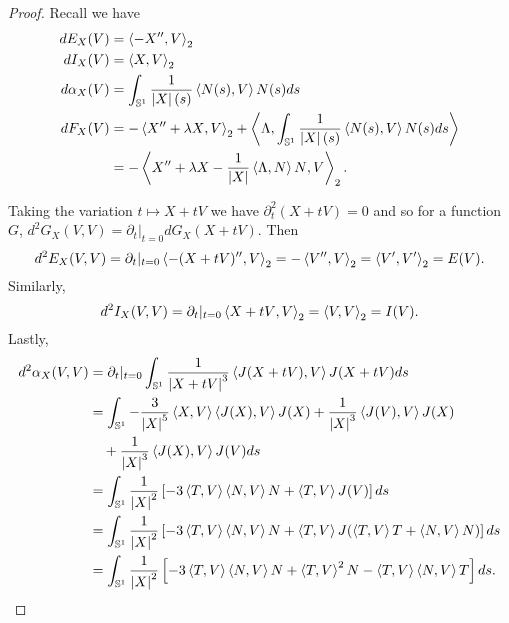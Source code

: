 \documentclass[12pt]{article}
\begin{document}
\begin{proof}
Recall we have
\begin{align*}
dE_X (V) &= \inpr{-X''}{V}_2 \\
dI_X (V) &= \inpr{X}{V}_2 \\
d\alpha_X (V) &= \int_{\So} \frac{1}{\abs{X}(s)} \inpr{N(s)}{V} N(s) ds \\
dF_X (V) &= -\inpr{X'' + \lambda X}{V}_2 + \inpr{\Lambda}{\int_{\So} \frac{1}{\abs{X}(s)} \inpr{N(s)}{V} N(s) ds} \\
&= -\inpr{X'' + \lambda X - \frac{1}{\abs{X}} \inpr{\Lambda}{N}N}{V}_2.
\end{align*}

Taking the variation \(t \mapsto X + tV\) we have \(\partial_t^2 (X + tV) = 0\) and so for a function \(G\), \(d^2G_X (V, V) = \partial_t|_{t=0} dG_X(X + t V)\).
Then
\[
d^2E_X(V, V) = \partial_t|_{t=0} \inpr{-(X + tV)''}{V}_2 = -\inpr{V''}{V}_2 = \inpr{V'}{V'}_2 = E(V).
\]
Similarly,
\[
d^2I_X(V, V) = \partial_t|_{t=0} \inpr{X + t V}{V}_2 = \inpr{V}{V}_2 = I(V).
\]
Lastly,
\[
\begin{split}
d^2\alpha_X(V, V) &= \partial_t|_{t=0} \int_{\So} \frac{1}{\abs{X+tV}^3} \inpr{J(X+tV)}{V} J(X + tV) ds \\
&= \int_{\So} -\frac{3}{\abs{X}^5} \inpr{X}{V} \inpr{J(X)}{V} J(X) + \frac{1}{\abs{X}^3} \inpr{J(V)}{V} J(X) \\
&\quad + \frac{1}{\abs{X}^3} \inpr{J(X)}{V} J(V) ds \\
&= \int_{\So} \frac{1}{\abs{X}^2}\left[-3\inpr{T}{V}\inpr{N}{V} N + \inpr{T}{V} J(V)\right] ds \\
&= \int_{\So} \frac{1}{\abs{X}^2} \left[-3\inpr{T}{V}\inpr{N}{V} N + \inpr{T}{V} J(\inpr{T}{V} T + \inpr{N}{V} N) \right] ds \\
&= \int_{\So} \frac{1}{\abs{X}^2} \left[-3\inpr{T}{V}\inpr{N}{V} N + \inpr{T}{V}^2 N - \inpr{T}{V}\inpr{N}{V} T \right] ds.
\end{split}
\]
\end{proof}
\end{document}
